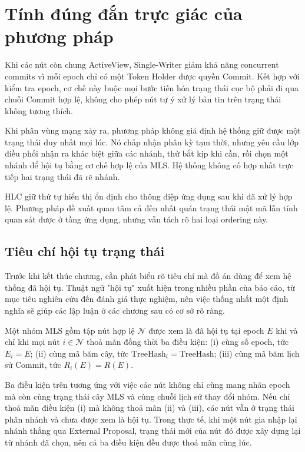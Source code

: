 \documentclass[../DoAn.tex]{subfiles}
\begin{document}
\section{Tính đúng đắn trực giác của phương pháp}
\label{sec:correctness-intuition}

Khi các nút còn chung ActiveView, Single-Writer giảm khả năng concurrent commits vì mỗi epoch chỉ có một Token Holder được quyền Commit. Kết hợp với kiểm tra epoch, cơ chế này buộc mọi bước tiến hóa trạng thái cục bộ phải đi qua chuỗi Commit hợp lệ, không cho phép nút tự ý xử lý bản tin trên trạng thái không tương thích.

Khi phân vùng mạng xảy ra, phương pháp không giả định hệ thống giữ được một trạng thái duy nhất mọi lúc. Nó chấp nhận phân kỳ tạm thời, nhưng yêu cầu lớp điều phối nhận ra khác biệt giữa các nhánh, thử bắt kịp khi cần, rồi chọn một nhánh để hội tụ bằng cơ chế hợp lệ của MLS. Hệ thống không cố hợp nhất trực tiếp hai trạng thái đã rẽ nhánh.

HLC giữ thứ tự hiển thị ổn định cho thông điệp ứng dụng sau khi đã xử lý hợp lệ. Phương pháp đề xuất quan tâm cả đến nhất quán trạng thái mật mã lẫn tính quan sát được ở tầng ứng dụng, nhưng vẫn tách rõ hai loại ordering này.

\subsection{Tiêu chí hội tụ trạng thái}
\label{sec:tieu_chi_hoi_tu}

Trước khi kết thúc chương, cần phát biểu rõ tiêu chí mà đồ án dùng để xem hệ thống đã hội tụ. Thuật ngữ "hội tụ" xuất hiện trong nhiều phần của báo cáo, từ mục tiêu nghiên cứu đến đánh giá thực nghiệm, nên việc thống nhất một định nghĩa sẽ giúp các lập luận ở các chương sau có cơ sở rõ ràng.

\begin{definition}
\label{def:hoi_tu_trang_thai}
Một nhóm MLS gồm tập nút hợp lệ $\mathcal{N}$ được xem là đã hội tụ tại epoch $E$ khi và chỉ khi mọi nút $i \in \mathcal{N}$ thoả mãn đồng thời ba điều kiện: (i) cùng số epoch, tức $E_i = E$; (ii) cùng mã băm cây, tức $\text{TreeHash}_i = \text{TreeHash}$; (iii) cùng mã băm lịch sử Commit, tức $R_i(E) = R(E)$.
\end{definition}

Ba điều kiện trên tương ứng với việc các nút không chỉ cùng mang nhãn epoch mà còn cùng trạng thái cây MLS và cùng chuỗi lịch sử thay đổi nhóm. Nếu chỉ thoả mãn điều kiện (i) mà không thoả mãn (ii) và (iii), các nút vẫn ở trạng thái phân nhánh và chưa được xem là hội tụ. Trong thực tế, khi một nút gia nhập lại nhánh thắng qua External Proposal, trạng thái mới của nút đó được xây dựng lại từ nhánh đã chọn, nên cả ba điều kiện đều được thoả mãn cùng lúc.
\end{document}

